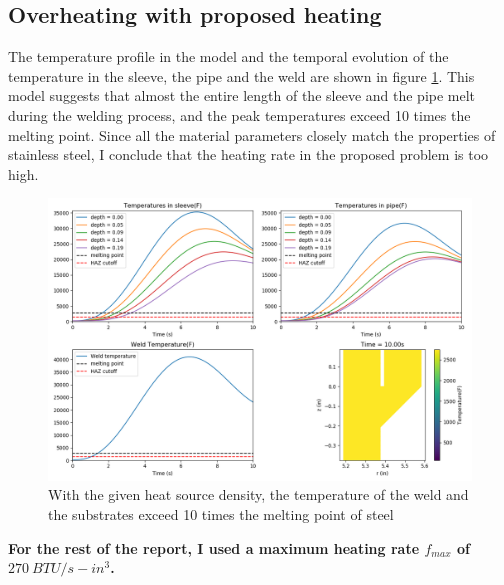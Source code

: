 \documentclass{article}
\begin{document}
\subsection{Overheating with proposed heating}

	The temperature profile in the model and the temporal evolution of the temperature in the sleeve, the pipe and the weld are shown in figure \ref{fig2}. This model suggests that almost the entire length of the sleeve and the pipe melt during the welding process, and the peak temperatures exceed 10 times the melting point. Since all the material parameters closely match the properties of stainless steel, I conclude that the heating rate in the proposed problem is too high.\\ 

\begin{figure}[h]
\centering
\includegraphics[width=12cm]{old_model.png}
\caption{With the given heat source density, the temperature of the weld and the substrates exceed 10 times the melting point of steel}
\label{fig2}
\end{figure}

\textbf{For the rest of the report, I used a maximum heating rate $f_{max}$ of $270~ BTU/s-in^3$.}
\end{document}
